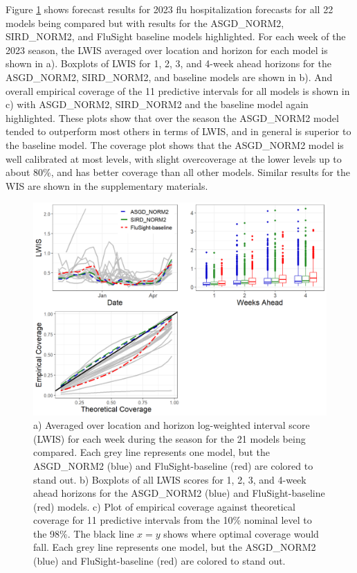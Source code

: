Figure \ref{fig:lwis_cover_sum} shows forecast results for 2023 flu 
hospitalization forecasts for all 22 models being compared but with results
for the ASGD\_NORM2, SIRD\_NORM2, and FluSight baseline models highlighted. 
For each week of the 2023 season, the  
LWIS averaged over location and horizon 
for each model is shown in a). Boxplots of LWIS for 1, 2, 3, and 4-week ahead
horizons for the ASGD\_NORM2, SIRD\_NORM2, and baseline models are shown in b). 
And 
overall empirical coverage of the 11 predictive intervals for all models is 
shown in c) with ASGD\_NORM2, SIRD\_NORM2
and the baseline model again highlighted. 
These plots show that over the season the ASGD\_NORM2 model tended to 
outperform most others in terms of LWIS, and in general is superior to the 
baseline model. The coverage plot shows that the ASGD\_NORM2 model is well 
calibrated at most levels, with slight overcoverage at the lower levels
up to about 80\%, and has better coverage than all other models. Similar results
for the WIS are shown in the supplementary materials.






\begin{figure}[hbt!]
    
    \begin{adjustwidth}{-1.2cm}{-1.5cm}
    \includegraphics[scale = .54]{Images/lwis_cover_sum.png}
    \caption{a) Averaged over location and horizon log-weighted interval score
    (LWIS) for each week during the season for the 21 models being compared. 
    Each grey line represents one model, but the ASGD\_NORM2 (blue) and 
    FluSight-baseline (red) are colored to stand out.
    b) Boxplots of all LWIS scores for 1, 2, 3, and 4-week ahead horizons 
    for the ASGD\_NORM2 (blue) and FluSight-baseline (red) models.
    c) Plot of empirical coverage against theoretical coverage for 11 
    predictive intervals from the 10\% nominal level to the 98\%. The black
    line $x = y$ shows where optimal coverage would fall.
    Each grey line represents one model, but the ASGD\_NORM2 (blue) and 
    FluSight-baseline (red) are colored to stand out.}
    \end{adjustwidth}
    \label{fig:lwis_cover_sum}
\end{figure}

